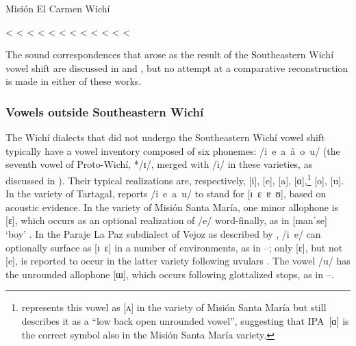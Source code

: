 \ea
Misión El Carmen Wichí \citep[125, 127, 130, 132, 137]{MC09}
    \begin{xlist}
        \ex {} <  \label{mec-vs-paralytic}
        \ex {} <  \label{mec-vs-ear}
        \ex {} <  \label{mec-vs-wound}
        \ex {} \recind {} < 
        \ex {} <  \label{mec-vs-butterfly}
        \ex {} <  \label{mec-vs-red}
        \ex {} <  \label{mec-vs-pocket}
        \ex {} <  \label{mec-vs-tobacco}
        \ex {} \recind {} \recind {} < 
        \ex {} < 
        \ex {} \recind {} < 
        \ex {} <  \label{mec-vs-steals}
    \end{xlist}
\z
{}

The sound correspondences that arose as the result of the Southeastern Wichí vowel shift are discussed in \citet{CM-JB-90} and \citet{LCB15}, but no attempt at a comparative reconstruction is made in either of these works.

\subsubsection{Vowels outside Southeastern Wichí}

The Wichí dialects that did not undergo the Southeastern Wichí vowel shift typically have a vowel inventory composed of six phonemes: /i~e~a~å~o~u/ (the seventh vowel of Proto-Wichí, */ɪ/, merged with /i/ in these varieties, as discussed in ). Their typical realizations are, respectively, [i], [e], [a], [ɑ],\footnote{\citet{SS07} represents this vowel as [ʌ] in the variety of Misión Santa María but still describes it as a ``low back open unrounded vowel'', suggesting that IPA~[ɑ] is the correct symbol also in the Misión Santa María variety.} [o], [u]. In the variety of Tartagal, \citet[362]{LCB15} reports /i~e~a~u/ to stand for [ɪ~ɛ~ɐ~ʊ], based on acoustic evidence. In the variety of Misión Santa María, one minor allophone is [ɛ], which occurs as an optional realization of /e/ word-finally, as in [manˈse] \recind [manˈsɛ] `boy' \citep{SS07}. In the Paraje La Paz subdialect of Vejoz as described by \citet{AFG067}, /i~e/ can optionally surface as [ɪ~ɛ] in a number of environments, as in –; only [ɛ], but not [e], is reported to occur in the latter variety following uvulars . The vowel /u/ has the unrounded allophone [ɯ], which occurs following glottalized stops, as in –.

